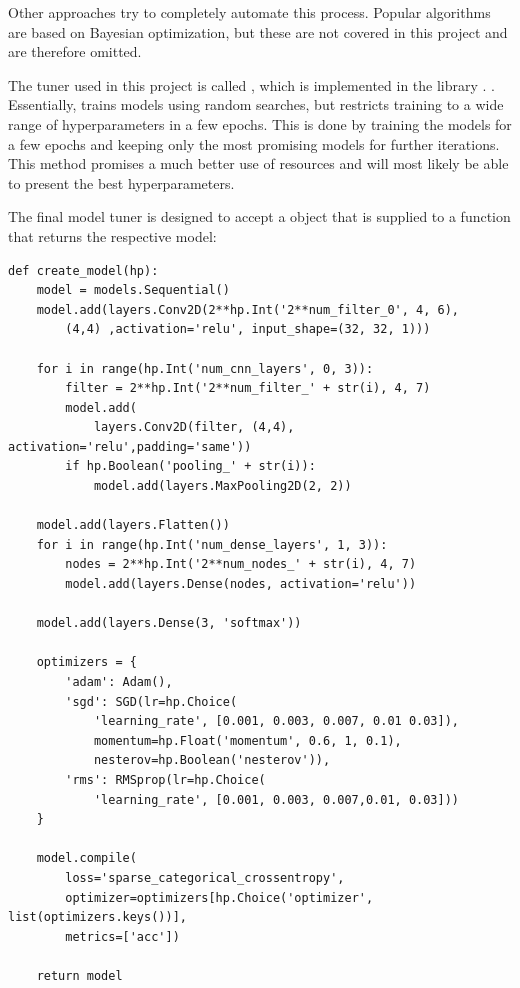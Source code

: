 Other approaches try to completely automate this process.
Popular algorithms are based on Bayesian optimization, but these are not covered in this project and are therefore omitted.

The tuner used in this project is called  \cite{Li2018}, which is implemented in the library . \cite{Google2019a}.
Essentially,  trains models using random searches, but restricts training to a wide range of hyperparameters in a few epochs.
This is done by training the models for a few epochs and keeping only the most promising models for further iterations.
This method promises a much better use of resources and will most likely be able to present the best hyperparameters.

The final model tuner is designed to accept a  object that is supplied to a function that returns the respective model:

\begin{lstlisting}
def create_model(hp):
    model = models.Sequential()
    model.add(layers.Conv2D(2**hp.Int('2**num_filter_0', 4, 6),
        (4,4) ,activation='relu', input_shape=(32, 32, 1)))

    for i in range(hp.Int('num_cnn_layers', 0, 3)):
        filter = 2**hp.Int('2**num_filter_' + str(i), 4, 7)
        model.add(
            layers.Conv2D(filter, (4,4), activation='relu',padding='same'))
        if hp.Boolean('pooling_' + str(i)):
            model.add(layers.MaxPooling2D(2, 2))

    model.add(layers.Flatten())
    for i in range(hp.Int('num_dense_layers', 1, 3)):
        nodes = 2**hp.Int('2**num_nodes_' + str(i), 4, 7)
        model.add(layers.Dense(nodes, activation='relu'))
    
    model.add(layers.Dense(3, 'softmax'))

    optimizers = {
        'adam': Adam(),
        'sgd': SGD(lr=hp.Choice(
            'learning_rate', [0.001, 0.003, 0.007, 0.01 0.03]),
            momentum=hp.Float('momentum', 0.6, 1, 0.1),
            nesterov=hp.Boolean('nesterov')),
        'rms': RMSprop(lr=hp.Choice(
            'learning_rate', [0.001, 0.003, 0.007,0.01, 0.03]))
    }

    model.compile(
        loss='sparse_categorical_crossentropy',
        optimizer=optimizers[hp.Choice('optimizer', list(optimizers.keys())],
        metrics=['acc'])

    return model
\end{lstlisting}

